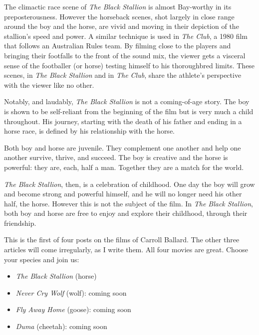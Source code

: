 The climactic race scene of \textit{The Black Stallion} is almost Bay-worthy in its preposterousness. However the horseback scenes, shot largely in close range around the boy and the horse, are vivid and moving in their depiction of the stallion's speed and power. A similar technique is used in \textit{The Club}, a 1980 film that follows an Australian Rules team. By filming close to the players and bringing their footfalls to the front of the sound mix, the viewer gets a visceral sense of the footballer (or horse) testing himself to his thoroughbred limits. These scenes, in \textit{The Black Stallion} and in \textit{The Club}, share the athlete's perspective with the viewer like no other.

Notably, and laudably, \textit{The Black Stallion} is not a coming-of-age story. The boy is shown to be self-reliant from the beginning of the film but is very much a child throughout. His journey, starting with the death of his father and ending in a horse race, is defined by his relationship with the horse.

Both boy and horse are juvenile. They complement one another and help one another survive, thrive, and succeed. The boy is creative and the horse is powerful: they are, each, half a man. Together they are a match for the world.

\textit{The Black Stallion}, then, is a celebration of childhood. One day the boy will grow and become strong and powerful himself, and he will no longer need his other half, the horse. However this is not the subject of the film. In \textit{The Black Stallion}, both boy and horse are free to enjoy and explore their childhood, through their friendship.

\secdiv

This is the first of four posts on the films of Carroll Ballard. The other three articles will come irregularly, as I write them. All four movies are great. Choose your species and join us:

\begin{itemize}
  \item \textit{The Black Stallion} (horse)
  \item \textit{Never Cry Wolf} (wolf): coming soon
  \item \textit{Fly Away Home} (goose): coming soon
  \item \textit{Duma} (cheetah): coming soon
\end{itemize}
